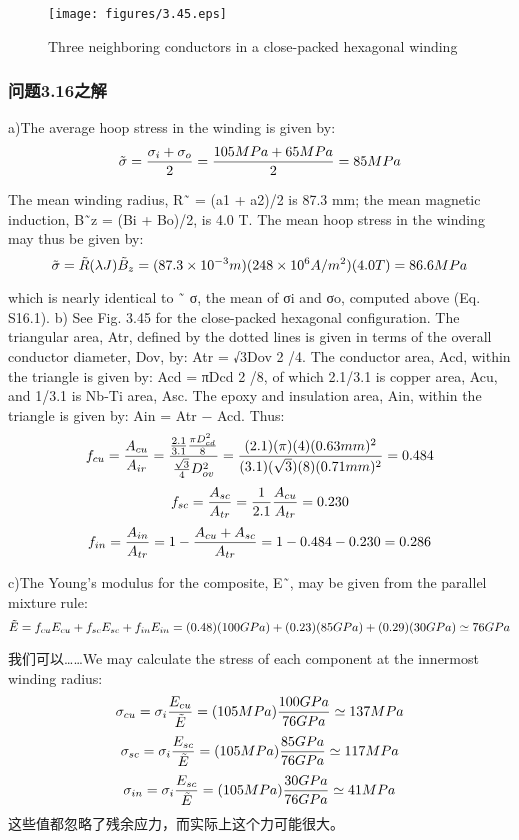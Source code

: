 \begin{figure}[htbp]
	\centering
	\texttt{[image: figures/3.45.eps]}
	\caption{Three neighboring conductors in a close-packed hexagonal winding}
\end{figure}


\subsubsection{问题3.16之解}
a)The average hoop stress in the winding is given by:
$$
\tilde{\sigma}=\frac{\sigma_{i}+\sigma_{o}}{2}=\frac{105MPa+65MPa}{2}\\%
=85MPa\\
$$

The mean winding radius, R˜ = (a1 + a2)/2 is 87.3 mm; the mean magnetic induction, B˜z = (Bi + Bo)/2, is 4.0 T. The mean hoop stress in the winding may thus
be given by:
$$
\tilde{\sigma}=\tilde{R}(\lambda J)\tilde{B}_{z}=(87.3\times10^{-3}m)(248\times10^{6}A/m^{2})(4.0T)\\%
=86.6MPa\\
$$

which is nearly identical to ˜ σ, the mean of σi and σo, computed above (Eq. S16.1).
b) See Fig. 3.45 for the close-packed hexagonal configuration. The triangular
area, Atr, defined by the dotted lines is given in terms of the overall conductor
diameter, Dov, by: Atr = √3Dov 2 /4. The conductor area, Acd, within the triangle
is given by: Acd = πDcd 2 /8, of which 2.1/3.1 is copper area, Acu, and 1/3.1 is
Nb-Ti area, Asc. The epoxy and insulation area, Ain, within the triangle is given
by: Ain = Atr − Acd. Thus:
$$
f_{cu}=\frac{A_{cu}}{A_{ir}}=\frac{\frac{2.1}{3.1}\frac{\pi D_{cd}^{2}}{8}}{\frac{\sqrt{3}}{4}D_{ov}^{2}}=\frac{(2.1)(\pi)(4)(0.63mm)^{2}}{(3.1)(\sqrt{3})(8)(0.71mm)^{2}}=0.484\\%
$$
$$
f_{sc}=\frac{A_{sc}}{A_{tr}}=\frac{1}{2.1}\frac{A_{cu}}{A_{tr}}=0.230\\%
$$
$$
f_{in}=\frac{A_{in}}{A_{tr}}=1-\frac{A_{cu}+A_{sc}}{A_{tr}}=1-0.484-0.230=0.286\\%
$$

c)The Young’s modulus for the composite, E˜, may be given from the parallel
mixture rule:
$$
\tilde{E}=f_{cu}E_{cu}+f_{sc}E_{sc}+f_{in}E_{in}\\%
=(0.48)(100GPa)+(0.23)(85GPa)+(0.29)(30GPa)\\
\simeq76GPa
$$

我们可以……We may calculate the stress of each component at the innermost winding radius:
$$
\sigma_{cu}=\sigma_{i}\frac{E_{cu}}{\tilde{E}}=(105MPa)\frac{100GPa}{76GPa}\simeq137MPa\\%
$$
$$
\sigma_{sc}=\sigma_{i}\frac{E_{sc}}{\tilde{E}}=(105MPa)\frac{85GPa}{76GPa}\simeq117MPa\\%
$$
$$
\sigma_{in}=\sigma_{i}\frac{E_{sc}}{\tilde{E}}=(105MPa)\frac{30GPa}{76GPa}\simeq41MPa\\%
$$
这些值都忽略了残余应力，而实际上这个力可能很大。
\newpage



